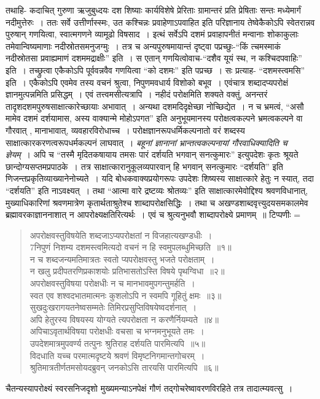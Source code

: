 {तथाहि- कदाचित् गुरुणा ऋजुबुध्दयः दश शिष्याः कार्यविशेषे प्रेरिताः ग्रामान्तरं प्रति प्रेषिताः सन्तः मध्येमार्गं नदीमुत्तेरुः~। ततः सर्वे उत्तीर्णास्स्मः, उत कश्चिन्नः प्रवाहेणाऽपवाहित इति परिज्ञानाय तेष्वेकैकोऽपि स्वेतरान्नव पुरुषान् गणयित्वा, स्वात्मगणने व्यामूढो विषसाद~। इत्थं सर्वेऽपि दशमं प्रवाहापनीतं मन्वानाः शोकाकुलाः तमेवान्विष्यमाणाः नदीस्रोतसमनुजग्मुः~। तत्र च अन्यपुरुषमायान्तं दृष्ट्वा पप्रच्छुः-“किं त्चमस्माकं नदीस्रोतसा प्रवाह्यमाणं दशममद्राक्षीः” इति~। स एतान् गणयित्वोवाच-“दशैव यूयं स्थ, न कश्चिदपवाहिः” इति~। तच्छ्रुत्वा एकैकोऽपि पूर्ववन्नवैव गणयित्वा “को दशमः” इति पप्रच्छ~। सः प्रत्याह- “दशमस्त्वमसि” इति~। एकैकोऽपि एवमेव तस्य वचनं श्रुत्वा, निपुणमवधार्य विशोको बभूव~। एवंचात्र शब्दादप्यपरोक्षं ज्ञानमुत्पन्नमिति प्रसिद्धम्~। एवं तत्त्वमसीत्यत्रापि~। नहीदं परोक्षमिति शक्यते वक्तुं, अनन्तरं तादृशदशमपुरुषसाक्षात्कारेच्छायाः अभावात्~। अन्यथा दशमदिदृक्षेच्छा नोच्छिद्येत~। न च भ्रमत्वं, “असौ मामेव दशमं दर्शयामास, अस्य वाक्यान्मे मोहोऽपगत” इति अनुभूयमानस्य परोक्षत्वकल्पने भ्रमत्वकल्पने वा गौरवात् , मानाभावात्, व्यवहारविरोधाच्च~। परोक्षज्ञानरूपधर्मिकल्पनातो वरं शब्दस्य साक्षात्कारकरणत्वरूपधर्मकल्पनं लाघवात्~। \textit{बहूनां ज्ञानानां भ्रान्तत्वकल्पनायां गौरवाधिक्यादिति च ज्ञेयम्}~। अपि च “तस्मै मृदितकषायाय तमसः पारं दर्शयति भगवान् सनत्कुमारः” इत्युपदेशः कृतः श्रूयते छान्दोग्यसप्तमप्रपाठके~। तत्र साक्षात्कारानुकूलव्यपारवान् हि भगवान् सनत्कुमारः “दर्शयति” इति णिजन्तप्रकृतिव्याख्यानेनोच्यते~। यदि बोधकवाक्यप्रयोगरूपः उपदेशः शिष्यस्य साक्षात्कारे हेतुः न स्यात्, तदा “दर्शयति” इति नाऽवक्ष्यत्~। तथा “आत्मा वारे द्रष्टव्यः श्रोतव्यः” इति साक्षात्कारमेवोद्दिश्य श्रवणविधानात्, मुख्याधिकारिणां श्रवणमात्रेण कृतार्थताश्रुतेश्च शाब्दापरोक्षसिद्धिः~। तथा च अखण्डशाब्दवृत्त्युदयसमकालमेव ब्रह्मावरकाज्ञाननाशात् न आपरोक्ष्यक्षतिरित्यर्थः~। एवं च श्रुत्यनुभवौ शाब्दापरोक्ष्ये प्रमाणम्~॥ टिप्पणीः =
\begin{verse}
अपरोक्षवस्तुविषयेति शब्दजाऽप्यपरोक्षतां न विजहात्यखण्डधीः~। \\
7निपुणं निशम्य दशमस्त्वमित्यदो वचनं न हि स्वमुपलब्धुमिच्छति~॥१॥\\
न च शब्दजन्यमतिमात्रतः स्वतो प्यपरोक्षवस्तु भजते परोक्षताम्~। \\
न खलु प्रदीपतरणिप्रकाशयोः प्रतिभासतोऽस्ति विषये पृथग्विधा~॥२॥\\
अपरोक्षवस्तुविषया परोक्षधीः न च मानभावमुपगन्तुमर्हति~। \\
स्वत एव शश्वदभातमात्मनः कुशलोऽपि न स्वमपि गूहितुं क्षमः~॥३॥\\
सुखदुःखरागयतनेष्वसम्मतेः तिमिरप्रसुप्तिविषयेष्वदर्शनात्~। \\
अपि हेतुरस्य विषयस्य योग्यते त्यपरोक्षता न करणैर्नियम्यते~॥४॥\\
अपिचाऽवृतार्थविषया परोक्षधीः वचसा च भग्नमनुभूयते तमः~। \\
उपदेशमात्रमुपवर्ण्य तत्पुनः श्रुतिराह दर्शयति पारमित्यपि~॥५॥\\
विदधाति यच्च परमात्मदृष्टये श्रवणं विमृष्टनिगमान्तगोचरम्~। \\
श्रुतिमात्रतीर्णतमसोयदब्रुवन् जनकोऽसि तारयसि पारमित्यपि~॥६॥\\
\end{verse}
चैतन्यस्यापरोक्ष्यं स्वरसनिजदृशो मुख्यमन्याऽनपेक्षं गौणं तद्गोचरेष्वावरणविरहिते तत्र तादात्म्यवत्सु~। 

}
